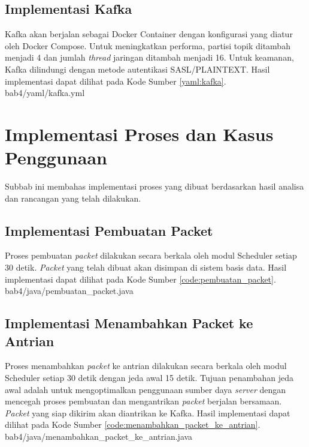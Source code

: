 \subsection{Implementasi Kafka}
\par Kafka akan berjalan sebagai Docker Container dengan konfigurasi yang diatur oleh Docker Compose. Untuk meningkatkan performa, partisi topik ditambah menjadi 4 dan jumlah \textit{thread} jaringan ditambah menjadi 16. Untuk keamanan, Kafka dilindungi dengan metode autentikasi SASL/PLAINTEXT. Hasil implementasi dapat dilihat pada Kode Sumber \ref{yaml:kafka}.
 {bab4/yaml/kafka.yml}

\section{Implementasi Proses dan Kasus Penggunaan}
\par Subbab ini membahas implementasi proses yang dibuat berdasarkan hasil analisa dan rancangan yang telah dilakukan.
\clearpage

\subsection{Implementasi Pembuatan Packet}
\par Proses pembuatan \textit{packet} dilakukan secara berkala oleh modul Scheduler setiap 30 detik. \textit{Packet} yang telah dibuat akan disimpan di sistem basis data. Hasil implementasi dapat dilihat pada Kode Sumber \ref{code:pembuatan_packet}.
 {bab4/java/pembuatan_packet.java}

\subsection{Implementasi Menambahkan Packet ke Antrian}
\par Proses menambahkan \textit{packet} ke antrian dilakukan secara berkala oleh modul Scheduler setiap 30 detik dengan jeda awal 15 detik. Tujuan penambahan jeda awal adalah untuk mengoptimalkan penggunaan sumber daya \textit{server} dengan mencegah proses pembuatan dan mengantrikan \textit{packet} berjalan bersamaan. \textit{Packet} yang siap dikirim akan diantrikan ke Kafka. Hasil implementasi dapat dilihat pada Kode Sumber \ref{code:menambahkan_packet_ke_antrian}.
 {bab4/java/menambahkan_packet_ke_antrian.java}

